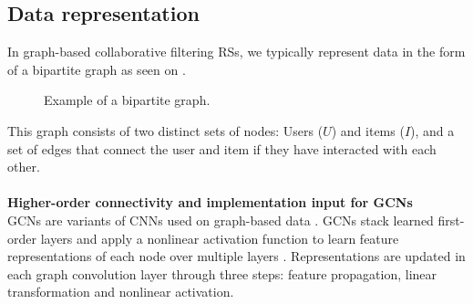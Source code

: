 \subsection{Data representation}
In graph-based collaborative filtering RSs, we typically represent data in the form of a bipartite graph as seen on .
\begin{figure}[h]
\caption{Example of a bipartite graph.}
\label{fig:bipartite-graph}
\end{figure}
This graph consists of two distinct sets of nodes: Users ($U$) and items ($I$), and a set of edges that connect the user and item if they have interacted with each other.\\\\
\textbf{Higher-order connectivity and implementation input for GCNs}
\\
GCNs are variants of CNNs used on graph-based data \cite{KOrderConnectivity}.
GCNs stack learned first-order layers and apply a nonlinear activation function to learn feature representations of each node over multiple layers \cite{KOrderConnectivity}.
Representations are updated in each graph convolution layer through three steps: feature propagation, linear transformation and nonlinear activation.
